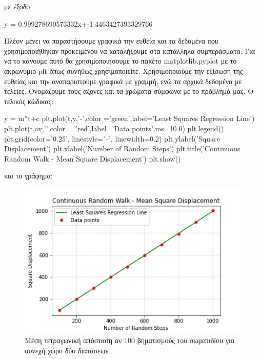 \gr 
με έξοδο
\en
\begin{python}
y = 0.999278690573332x+-1.4463427393329766
\end{python}
\gr 
Πλέον μένει να παραστήσουμε γραφικά την ευθεία και τα δεδομένα που χρησιμοποιήθηκαν προκειμένου να καταλήξουμε στα κατάλληλα συμπεράσματα.
Για να το κάνουμε αυτό θα χρησιμοποιήσουμε το πακέτο {\en matplotlib.pyplot} με το ακρωνύμιο {\en plt} όπως συνήθως χρησιμοποιείτε. Χρησιμοποιούμε την εξίσωση της ευθείας και την αναπαριστούμε γραφικά με γραμμή, ενώ τα αρχικά δεδομένα με τελείες. Ονομάζουμε τους άξονες και τα χρώματα σύμφωνα με το πρόβλημά μας. Ο τελικός κώδικας: 
\en
\begin{python}
y = m*t+c
plt.plot(t,y,'-',color ='green',label='Least Squares Regression Line')
plt.plot(t,av,'.',color = 'red',label='Data points',ms=10.0)
plt.legend()
plt.grid(color='0.25', linestyle='--', linewidth=0.2)
plt.ylabel('Square Displacement')
plt.xlabel('Number of Random Steps')
plt.title('Continuous Random Walk - Mean Square Displacement')
plt.show()
\end{python}
\gr και το {\en } γράφημα:
\begin{figure}[H]
\begin{center}
\includegraphics[scale=1]{figures/CRW_MSD.png}
\caption{Μέση τετραγωνική απόσταση αν 100 βηματισμούς του σωματιδίου για συνεχή χώρο δύο διατάσεων}
\label{figuridion3d}
\end{center}
\end{figure}
